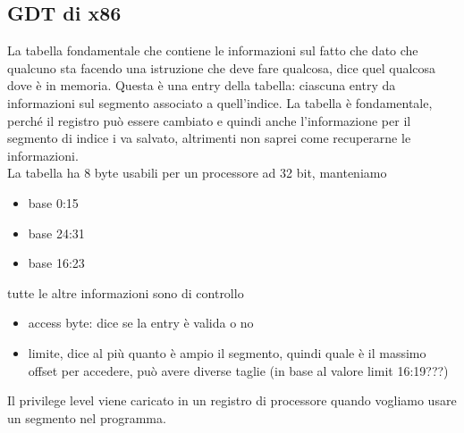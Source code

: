 \documentclass[12pt, oneside]{extbook}
\begin{document}
\subsection{GDT di x86}
La tabella fondamentale che contiene le informazioni sul fatto che dato che qualcuno sta facendo una istruzione che deve fare qualcosa, dice quel qualcosa dove è in memoria. Questa è una entry della tabella:
ciascuna entry da informazioni sul segmento associato a quell'indice. La tabella è fondamentale, perché il registro può essere cambiato e quindi anche l'informazione per il segmento di indice i va salvato, altrimenti non saprei come recuperarne le informazioni.\\ La tabella ha 8 byte usabili per un processore ad 32 bit, manteniamo
\begin{itemize}
\item base 0:15
\item base 24:31
\item base 16:23
\end{itemize}
tutte le altre informazioni sono di controllo
\begin{itemize}
\item access byte: dice se la entry è valida o no
\item limite, dice al  più quanto è ampio il segmento, quindi quale è il massimo offset per accedere, può avere diverse taglie (in base al valore limit 16:19???)
\end{itemize}
Il privilege level viene caricato in un registro di processore quando vogliamo usare un segmento nel programma.
\end{document}
